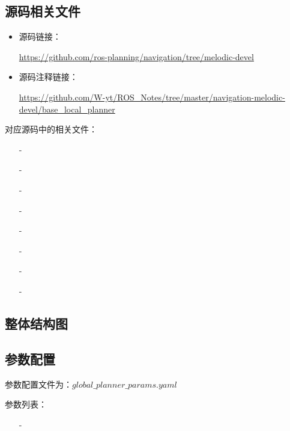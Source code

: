 \documentclass[9pt, oneside]{book}
\begin{document}
\subsection{源码相关文件}

\begin{itemize}
    \item 源码链接：
    
    \url{https://github.com/ros-planning/navigation/tree/melodic-devel}

    \item 源码注释链接：
    
    \small
    \url{https://github.com/W-yt/ROS_Notes/tree/master/navigation-melodic-devel/base_local_planner}
    \normalsize
\end{itemize}

对应源码中的相关文件：

\begin{itemize}
    \item [-] 
    \item [-] 
    \item [-] 
    \item [-] 
    \item [-] 
    \item [-] 
    \item [-] 
    \item [-] 
\end{itemize}

\subsection{整体结构图}


\subsection{参数配置}

参数配置文件为：$global\_planner\_params.yaml$

参数列表：

\begin{itemize}
    \item [-] 
\end{itemize}
\end{document}
